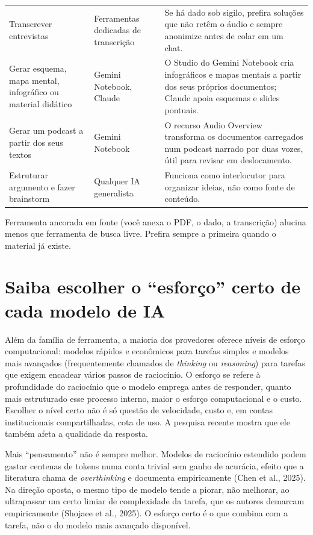 \documentclass[11pt,a4paper]{article}
\begin{document}
\begin{center}
\begin{tabular}{@{}>{\raggedright\arraybackslash}p{3.3cm}>{\raggedright\arraybackslash}p{3.3cm}p{7.6cm}@{}}
\rowcolor{azulUNIsuave!45}
Transcrever entrevistas & Ferramentas dedicadas de transcrição & Se há dado sob sigilo, prefira soluções que não retêm o áudio e sempre anonimize antes de colar em um chat. \\
Gerar esquema, mapa mental, infográfico ou material didático & Gemini Notebook, Claude & O Studio do Gemini Notebook cria infográficos e mapas mentais a partir dos seus próprios documentos; Claude apoia esquemas e slides pontuais. \\
\rowcolor{azulUNIsuave!45}
Gerar um podcast a partir dos seus textos & Gemini Notebook & O recurso Audio Overview transforma os documentos carregados num podcast narrado por duas vozes, útil para revisar em deslocamento. \\
Estruturar argumento e fazer brainstorm & Qualquer IA generalista & Funciona como interlocutor para organizar ideias, não como fonte de conteúdo. \\
\end{tabular}
\end{center}
\begin{dica}
Ferramenta ancorada em fonte (você anexa o PDF, o dado, a transcrição) alucina menos que ferramenta de busca livre. Prefira sempre a primeira quando o material já existe.
\end{dica}

\section{Saiba escolher o ``esforço'' certo de cada modelo de IA}
\small
Além da família de ferramenta, a maioria dos provedores oferece níveis de esforço computacional: modelos rápidos e econômicos para tarefas simples e modelos mais avançados (frequentemente chamados de \textit{thinking} ou \textit{reasoning}) para tarefas que exigem encadear vários passos de raciocínio. O esforço se refere à profundidade do raciocínio que o modelo emprega antes de responder, quanto mais estruturado esse processo interno, maior o esforço computacional e o custo. Escolher o nível certo não é só questão de velocidade, custo e, em contas institucionais compartilhadas, cota de uso. A pesquisa recente mostra que ele também afeta a qualidade da resposta.

\begin{atencao}
Mais ``pensamento'' não é sempre melhor. Modelos de raciocínio estendido podem gastar centenas de tokens numa conta trivial sem ganho de acurácia, efeito que a literatura chama de \textit{overthinking} e documenta empiricamente (Chen et al., 2025). Na direção oposta, o mesmo tipo de modelo tende a piorar, não melhorar, ao ultrapassar um certo limiar de complexidade da tarefa, que os autores demarcam empiricamente (Shojaee et al., 2025). O esforço certo é o que combina com a tarefa, não o do modelo mais avançado disponível.
\end{atencao}
\end{document}
